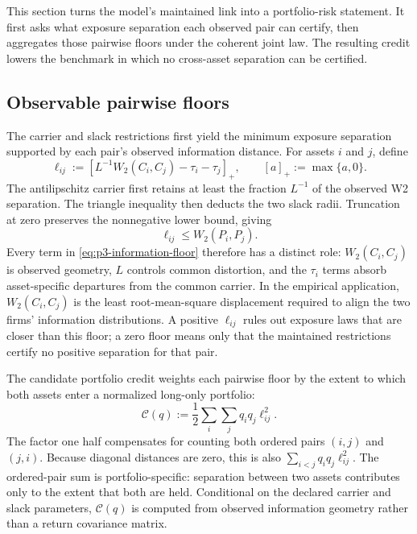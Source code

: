 
This section turns the model's maintained link into a portfolio-risk statement.
It first asks what exposure separation each observed pair can certify, then
aggregates those pairwise floors under the coherent joint law.
The resulting credit lowers the benchmark in which no cross-asset separation
can be certified.

\subsection{Observable pairwise floors}

The carrier and slack restrictions first yield the minimum exposure separation
supported by each pair's observed information distance.
For assets $i$ and $j$, define
\begin{equation}\label{eq:p3-information-floor}
  \ell_{ij}
  :=\left[
    L^{-1}W_2(C_i,C_j)-\tau_i-\tau_j
  \right]_+,
  \qquad [a]_+:=\max\{a,0\}.
\end{equation}
The antilipschitz carrier first retains at least the fraction $L^{-1}$ of the
observed W2 separation.
The triangle inequality then deducts the two slack radii.
Truncation at zero preserves the nonnegative lower bound, giving
\begin{equation}\label{eq:p3-floor-validity}
  \ell_{ij}\le W_2(P_i,P_j).
\end{equation}
Every term in \eqref{eq:p3-information-floor} therefore has a distinct role:
$W_2(C_i,C_j)$ is observed geometry, $L$ controls common distortion, and the
$\tau_i$ terms absorb asset-specific departures from the common carrier.
In the empirical application, $W_2(C_i,C_j)$ is the least root-mean-square
displacement required to align the two firms' information distributions.
A positive $\ell_{ij}$ rules out exposure laws that are closer than this floor;
a zero floor means only that the maintained restrictions certify no positive
separation for that pair.

The candidate portfolio credit weights each pairwise floor by the extent to
which both assets enter a normalized long-only portfolio:
\begin{equation}\label{eq:p3-certificate-credit}
  \mathcal C(q)
  :=\frac12\sum_i \sum_j q_i q_j\ell_{ij}^2.
\end{equation}
The factor one half compensates for counting both ordered pairs $(i,j)$ and
$(j,i)$.
Because diagonal distances are zero, this is also
$\sum_{i<j} q_i q_j\ell_{ij}^2$.
The ordered-pair sum is portfolio-specific: separation between two assets
contributes only to the extent that both are held.
Conditional on the declared carrier and slack parameters, $\mathcal C(q)$ is
computed from observed information geometry rather than a return covariance
matrix.

